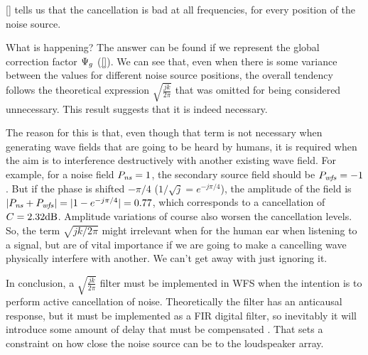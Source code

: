 \autoref{} tells us that the cancellation is bad at all frequencies, for every position of the noise source.

What is happening? The answer can be found if we represent the global correction factor $\globalCorrectionFactor$ (\autoref{}). We can see that, even when there is some variance between the values for different noise source positions, the overall tendency follows the theoretical expression $\sqrt{\frac{jk}{2\pi}}$ that was omitted for being considered unnecessary. This result suggests that it is indeed necessary.

The reason for this is that, even though that term is not necessary when generating wave fields that are going to be heard by humans, it is required when the aim is to interference destructively with another existing wave field. For example, for a noise field $\Field[ns][frequency] = 1$, the secondary source field should be $\Field[wfs][frequency] = -1$. But if the phase is shifted $-\pi/4$ ($1/\sqrt{j} = e^{-j\pi/4}$), the amplitude of the field is $|\Field[ns][frequency] + \Field[wfs][frequency]| = |1 - e^{-j\pi/4}| = 0.77$, which corresponds to a cancellation of $\cancellation = 2.32\si{dB}$. Amplitude variations of course also worsen the cancellation levels. So, the term $\sqrt{jk/2\pi}$ might irrelevant when for the human ear when listening to a signal, but are of vital importance if we are going to make a cancelling wave physically interfere with another. We can't get away with just ignoring it.

In conclusion, a $\sqrt{\frac{jk}{2\pi}}$ filter must be implemented in WFS when the intention is to perform active cancellation of noise. Theoretically the filter has an anticausal response, but it must be implemented as a FIR digital filter, so inevitably it will introduce some amount of delay that must be compensated \cite{Lapini2018}. That sets a constraint on how close the noise source can be to the loudspeaker array.